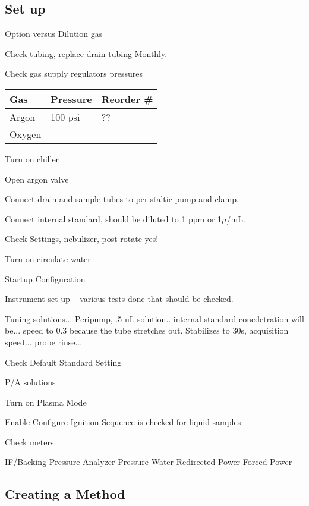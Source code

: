 \documentclass[12pt]{../SOP4_alpha}\usepackage[]{graphicx}\usepackage[]{color}
\begin{document}
\subsection{Set up}

\NP Option versus Dilution gas

\NP Check tubing, replace drain tubing Monthly.

\NP Check gas supply regulators pressures

\begin{table}[h]
\begin{tabular}{lll} \hline
Gas   &     Pressure    & Reorder \# \\ \hline\hline
Argon &       100 psi   & ??          \\
Oxygen&                 & \\ \hline

\end{tabular}
\end{table}

\NP Turn on chiller

\NP Open argon valve

\NP Connect drain and sample tubes to peristaltic pump and clamp.

\NP Connect internal standard, should be diluted to 1 ppm or 1$\mu$/mL. 

\NP Check Settings, nebulizer, post rotate yes!

\NP Turn on circulate water

\NP Startup Configuration

\NP Instrument set up -- various tests done that should be checked.

\NP Tuning solutions... Peripump, .5 uL solution.. internal standard concdetration will be...  speed to 0.3 because the tube stretches out. Stabilizes to 30s, acquisition speed... probe rinse... 

\NP Check Default Standard Setting

\NP P/A solutions

\NP Turn on Plasma Mode 

\NP Enable Configure Ignition Sequence is checked for liquid samples

\NP Check meters 

IF/Backing Pressure
Analyzer Pressure
Water
Redirected Power
Forced Power



\NP 


\subsection{Creating a Method}
\end{document}
